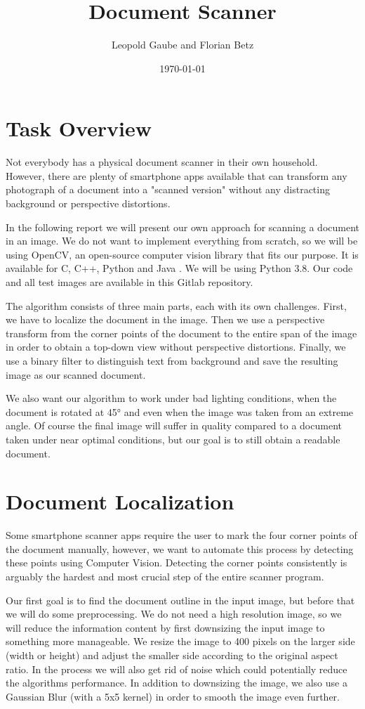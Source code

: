 \documentclass[bibliography=totoc]{scrartcl}
\title{Document Scanner}
\author{Leopold Gaube and Florian Betz}
\date{\today}
\begin{document}
\maketitle
\tableofcontents

\clearpage

\section{Task Overview}
Not everybody has a physical document scanner in their own household.
However, there are plenty of smartphone apps available that can transform any photograph of a document into a "scanned version" without any distracting background or perspective distortions.

In the following report we will present our own approach for scanning a document in an image.
We do not want to implement everything from scratch, so we will be using \acs{OpenCV}, an open-source computer vision library that fits our purpose.
It is available for C, C++, Python and Java \cite{OpenCV}.
We will be using Python 3.8. Our code and all test images are available in this Gitlab repository. \cite{Gitlab}

The algorithm consists of three main parts, each with its own challenges.
First, we have to localize the document in the image.
Then we use a perspective transform from the corner points of the document to the entire span of the image in order to obtain a top-down view without perspective distortions.
Finally, we use a binary filter to distinguish text from background and save the resulting image as our scanned document.

We also want our algorithm to work under bad lighting conditions, when the document is rotated at 45° and even when the image was taken from an extreme angle.
Of course the final image will suffer in quality compared to a document taken under near optimal conditions, but our goal is to still obtain a readable document.

\section{Document Localization}
Some smartphone scanner apps require the user to mark the four corner points of the document manually, however, we want to automate this process by detecting these points using Computer Vision.
Detecting the corner points consistently is arguably the hardest and most crucial step of the entire scanner program.

Our first goal is to find the document outline in the input image, but before that we will do some preprocessing.
We do not need a high resolution image, so we will reduce the information content by first downsizing the input image to something more manageable.
We resize the image to 400 pixels on the larger side (width or height) and adjust the smaller side according to the original aspect ratio.
In the process we will also get rid of noise which could potentially reduce the algorithms performance.
In addition to downsizing the image, we also use a Gaussian Blur (with a 5x5 kernel) in order to smooth the image even further.
\end{document}
